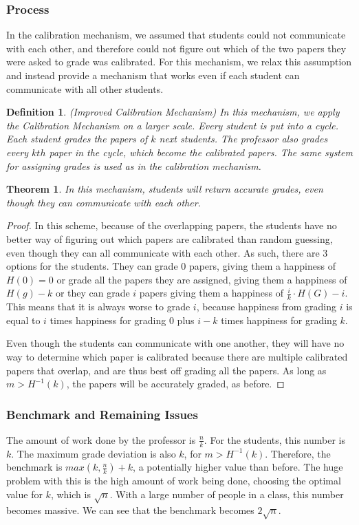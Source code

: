 \documentclass[12pt, Arial]{article}
\newtheorem{theorem}{Theorem}
\newtheorem{definition}{Definition}
\begin{document}
\subsubsection{Process}
In the calibration mechanism, we assumed that students could not communicate with each other, and therefore could not figure out which of the two papers they were asked to grade was calibrated. For this mechanism, we relax this assumption and instead provide a mechanism that works even if each student can communicate with all other students.
\begin{definition}(Improved Calibration Mechanism)
In this mechanism, we apply the Calibration Mechanism on a larger scale. Every student is put into a cycle. Each student grades the papers of $k$ next students. The professor also grades every $kth$ paper in the cycle, which become the calibrated papers. The same system for assigning grades is used as in the calibration mechanism.
\end{definition}
\begin{theorem}
In this mechanism, students will return accurate grades, even though they can communicate with each other.
\end{theorem}
\begin{proof}
In this scheme, because of the overlapping papers, the students have no better way of figuring out which papers are calibrated than random guessing, even though they can all communicate with each other. As such, there are 3 options for the students. They can grade 0 papers, giving them a happiness of $H(0) = 0$ or grade all the papers they are assigned, giving them a happiness of $H(g) - k$ or they can grade $i$ papers giving them a happiness of $\frac{i}{k} \cdot H(G)-i$. This means that it is always worse to grade $i$, because happiness from grading $i$ is equal to $i$ times happiness for grading 0 plus $i-k$ times happiness for grading $k$.

Even though the students can communicate with one another, they will have no way to determine which paper is calibrated because there are multiple calibrated papers that overlap, and are thus best off grading all the papers. As long as $m > H^{-1}(k)$, the papers will be accurately graded, as before.

\end{proof}
\subsubsection{Benchmark and Remaining Issues}
The amount of work done by the professor is $\frac{n}{k}$. For the students, this number is $k$. The maximum grade deviation is also $k$, for $m > H^{-1}(k)$. Therefore, the benchmark is $max(k, \frac{n}{k}) + k$, a potentially higher value than before. The huge problem with this is the high amount of work being done, choosing the optimal value for $k$, which is $\sqrt{n}$. With a large number of people in a class, this number becomes massive. We can see that the benchmark becomes $2\sqrt{n}$.
\end{document}
